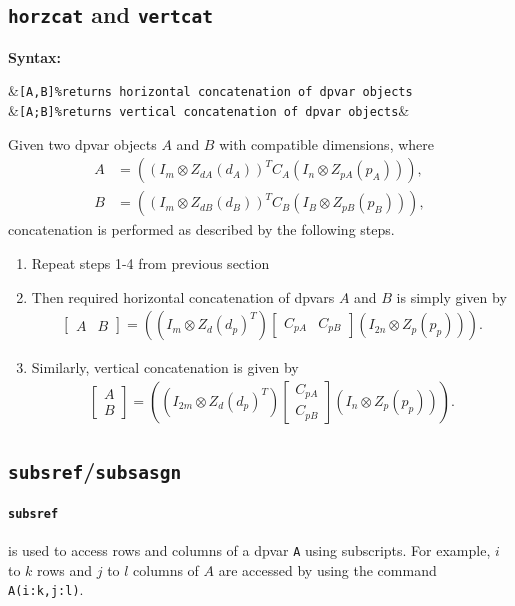 \documentclass{article}
\newcommand{\bmat}[1]{\begin{bmatrix} #1\end{bmatrix}}
\newcommand{\C}{\mathbb{C}}
\begin{document}
	\subsection{\texttt{horzcat} and \texttt{vertcat}}
	\textbf{Syntax:}
		\begin{flalign*}
			&\texttt{[A,B]\%returns horizontal concatenation of dpvar objects}\\
			&\texttt{[A;B]\%returns vertical concatenation of dpvar objects}&
		\end{flalign*}


	Given two dpvar objects $A$ and $B$ with compatible dimensions, where
	\begin{align*}
		A &= \left((I_m \otimes  Z_{dA}(d_A))^T C_A (I_n \otimes Z_{pA}(p_A))\right),\\
		B &= \left((I_m \otimes  Z_{dB}(d_B))^T C_B (I_B \otimes Z_{pB}(p_B))\right),
	\end{align*}
	concatenation is performed as described by the following steps.
	
	\begin{enumerate}
		\item Repeat steps 1-4 from previous section
		\item Then required horizontal concatenation of dpvars $A$ and $B$ is simply given by
		\begin{align*}
			\bmat{A&B} = \left((I_m \otimes  Z_{d}(d_p)^T) \bmat{C_{pA}&C_{pB}} (I_{2n} \otimes Z_{p}(p_p))\right).
		\end{align*}
		\item Similarly, vertical concatenation is given by
		\begin{align*}
			\bmat{A\\B} = \left((I_{2m} \otimes  Z_{d}(d_p)^T) \bmat{C_{pA}\\C_{pB}} (I_{n} \otimes Z_{p}(p_p))\right).
		\end{align*}
		
	\end{enumerate}
	
	\subsection{\texttt{subsref}/\texttt{subsasgn}}
	\paragraph{\texttt{subsref}} is used to access rows and columns of a dpvar \texttt{A} using subscripts. For example, $i$ to $k$ rows and $j$ to $l$ columns of $A$ are accessed by using the command \texttt{A(i:k,j:l)}.
\end{document}

